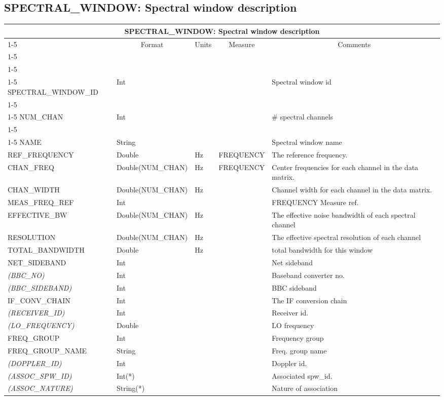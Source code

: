 \documentclass{article}
\newcommand{\defline}[1]{\cline{1-5}
\multicolumn{5}{|l|}{#1} \\
\cline{1-5}}
\newcommand{\definetable}[2]
{
	\vfill\newpage
	\subsection{#1}
        \vspace{0.15in}
        \small
	\begin{tabular}{|l|p{1.25in}|l|p{.9in}|p{1.4in}|}
	\hline
	\multicolumn{5}{|c|}{\bf #1}\\ 
	\cline{1-5}
        \multicolumn{1}{|c|}{Name}&\multicolumn{1}{|c|}{Format}&
        \multicolumn{1}{|c|}{Units}&\multicolumn{1}{|c|}{Measure}&
        \multicolumn{1}{|c|}{Comments}\\
        \cline{1-5}
        #2
        \hline
	\end{tabular}
}
\begin{document}
\definetable{SPECTRAL\_WINDOW: Spectral window description}{
\defline{\bf Columns}
\defline{\em Key}
SPECTRAL\_WINDOW\_ID &      Int &    &      & Spectral window id\\
\defline{\em Data description columns}
NUM\_CHAN   &     Int  &           &        & \# spectral channels \\
\defline{\em Data}  
NAME & String & & & Spectral window name\\
REF\_FREQUENCY     &   Double       &               Hz  &   FREQUENCY&        The reference frequency.\\
CHAN\_FREQ  &   Double(NUM\_CHAN)    &           Hz    &    FREQUENCY& Center frequencies for each channel in the data matrix.\\
CHAN\_WIDTH &   Double(NUM\_CHAN)    &           Hz    &    & Channel width for each channel in the data matrix.\\
MEAS\_FREQ\_REF & Int      & & & FREQUENCY Measure ref.\\
EFFECTIVE\_BW   &     Double(NUM\_CHAN)         &      Hz      &  &
The effective noise bandwidth of each spectral channel\\
RESOLUTION   &     Double(NUM\_CHAN)         &      Hz      &  &
The effective spectral resolution of each channel\\
TOTAL\_BANDWIDTH & Double & Hz &  & total bandwidth for this window \\
NET\_SIDEBAND & Int & & & Net sideband\\
{\it (BBC\_NO)} & Int & & & Baseband converter no.\\
{\it (BBC\_SIDEBAND)} & Int & & & BBC sideband\\
IF\_CONV\_CHAIN & Int & & & The IF conversion chain \\
{\it (RECEIVER\_ID)}    & Int & & & Receiver id.\\
{\it (LO\_FREQUENCY)}    & Double & & & LO frequency \\
FREQ\_GROUP & Int & & & Frequency group\\
FREQ\_GROUP\_NAME & String & & & Freq. group name \\
{\it (DOPPLER\_ID)} & Int & & & Doppler id.\\
{\it (ASSOC\_SPW\_ID)} & Int(*) & & & Associated spw\_id.\\
{\it (ASSOC\_NATURE)} & String(*) & & & Nature of association\\

} 
\end{document}

